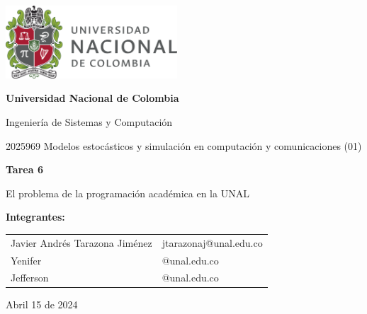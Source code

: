 \documentclass{article}
\begin{document}
\begin{titlepage}
    \centering
    \includegraphics[width=0.48\textwidth]{logo_universidad.png}
    \par\vspace{2cm}

    {\Large \textbf{Universidad Nacional de Colombia} \par}
    \vspace{0.5cm}
    {\large Ingeniería de Sistemas y Computación \par}
    {\large 2025969 Modelos estocásticos y simulación en computación y comunicaciones (01)\par}
    \vspace{3cm}

    {\large \textbf{Tarea 6} \par}
    {\large El problema de la programación académica en la UNAL \par}
    \vspace{3cm}

    {\large \textbf{Integrantes:} \par}
    \vspace{0.5cm}
    \begin{tabular}{ll}
    Javier Andrés Tarazona Jiménez & jtarazonaj@unal.edu.co \\
    Yenifer & @unal.edu.co \\
    Jefferson & @unal.edu.co \\
    \end{tabular}
    \par\vspace{3cm}

    {\large Abril 15 de 2024 \par}
\end{titlepage}

\tableofcontents %

\newpage %

\end{document}
